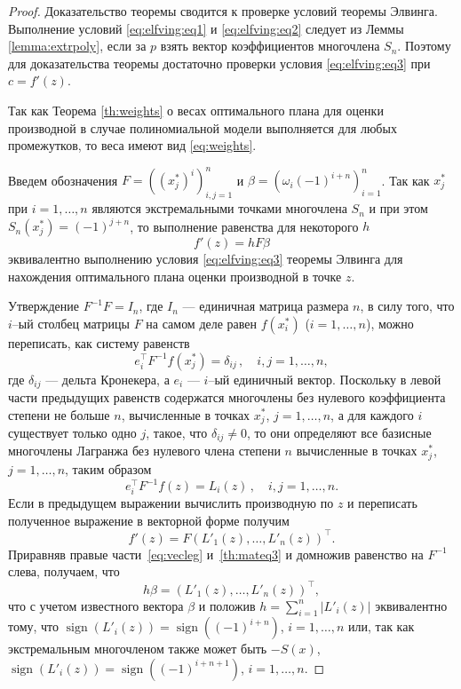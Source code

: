 \documentclass[specialist,
               substylefile = spbu.rtx,
               subf,href,colorlinks=true, 12pt]{disser}
\theoremstyle{definition}
\DeclareMathOperator*{\sign}{sign}
\newcommand\abs[1]{\left\lvert#1\right\rvert}
\begin{document}
	\begin{proof}
		Доказательство теоремы сводится к проверке условий теоремы Элвинга. Выполнение условий \eqref{eq:elfving:eq1} и \eqref{eq:elfving:eq2} следует из Леммы \ref{lemma:extrpoly}, если за $p$ взять вектор коэффициентов многочлена $S_n$. Поэтому для доказательства теоремы достаточно проверки условия \eqref{eq:elfving:eq3} при $c = f'(z)$.
	
	Так как Теорема \ref{th:weights} о весах оптимального плана для оценки производной в случае полиномиальной модели выполняется для любых промежутков, то веса имеют вид \eqref{eq:weights}.
	
	Введем обозначения $F = \left((x_j^*)^i\right)^n_{i, j = 1}$ и $\beta = \left( \omega_i (-1)^{i+n} \right)_{i=1}^n$. Так как $x_j^*$ при $i = 1, \ldots , n$ являются экстремальными точками многочлена $S_n$ и при этом $S_n(x_j^*) = (-1)^{j+n}$, то выполнение равенства для некоторого $h$
	\begin{equation}
		\label{th:mateq3}
		f'(z) = hF\beta
	\end{equation}
	 эквивалентно выполнению условия \eqref{eq:elfving:eq3} теоремы Элвинга для нахождения оптимального плана оценки производной в точке $z$.
	 
	Утверждение $F^{-1}F = I_n$, где $I_n$ --- единичная матрица размера $n$, в силу того, что $i$--ый столбец матрицы $F$ на самом деле равен $f(x_i^*)$ ($i = 1, \ldots, n$), можно переписать, как систему равенств
	\begin{equation*}
		e_i^{\top} F^{-1} f(x_j^*) = \delta_{ij} \, , \quad i, j = 1, \ldots , n ,
	\end{equation*}
	где $\delta_{ij}$ --- дельта Кронекера, а $e_i$ --- $i$--ый единичный вектор. Поскольку в левой части предыдущих равенств содержатся многочлены без нулевого коэффициента степени не больше $n$, вычисленные в точках $x_j^*$, $j=1, \ldots , n$, а для каждого $i$ существует только одно $j$, такое, что $\delta_{ij} \neq 0$, то они определяют все базисные многочлены Лагранжа без нулевого члена степени $n$ вычисленные в точках $x_j^*$, $j=1, \ldots , n$, таким образом
	\begin{equation*}
		e_i^{\top} F^{-1} f(z) = L_i(z) \, , \quad i, j = 1, \ldots , n .
	\end{equation*}
	Если в предыдущем выражении вычислить производную по $z$ и переписать полученное выражение в векторной форме получим
	\begin{equation}
		\label{eq:vecleg}
		f'(z) = F \left( L'_1(z), \ldots, L'_n(z) \right)^\top.
	\end{equation}
	Приравняв правые части~\eqref{eq:vecleg} и~\eqref{th:mateq3} и домножив равенство на $F^{-1}$ слева, получаем, что
	\begin{equation*}
		h \beta = \left( L'_1(z), \ldots, L'_n(z) \right)^\top,
	\end{equation*}
	что с учетом известного вектора $\beta$ и положив $h = \sum_{i=1}^n \abs{L'_i(z)}$ эквивалентно тому, что $\sign (L'_i(z)) = \sign((-1)^{i+n}) $, $i = 1, \ldots, n$ или, так как экстремальным многочленом также может быть $-S(x)$,  $\sign (L'_i(z)) = \sign((-1)^{i+n+1}) $, $i = 1, \ldots, n$.
	

\end{proof}
\end{document}
